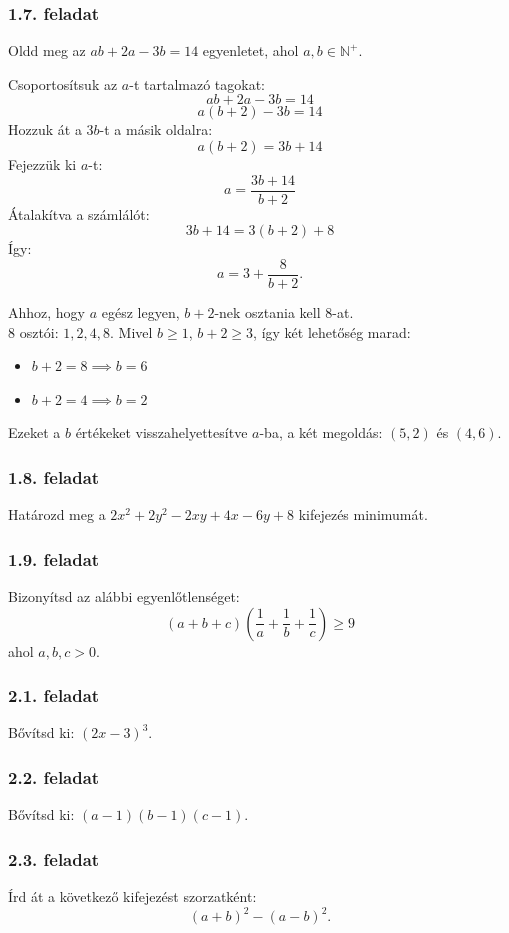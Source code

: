 \documentclass{article}
\begin{document}
\subsubsection{1.7. feladat}
Oldd meg az $ab + 2a - 3b = 14$ egyenletet, ahol $a, b \in \mathbb{N^+}$.

Csoportosítsuk az $a$-t tartalmazó tagokat:
\[
    ab + 2a - 3b = 14
\]
\[
    a(b+2) - 3b = 14
\]
Hozzuk át a $3b$-t a másik oldalra:
\[
    a(b+2) = 3b + 14
\]
Fejezzük ki $a$-t:
\[
    a = \frac{3b+14}{b+2} 
\]
Átalakítva a számlálót:
\[
    3b+14 = 3(b+2) + 8
\]
Így:
\[
    a = 3 + \frac{8}{b+2}.
\]

Ahhoz, hogy $a$ egész legyen, $b+2$-nek osztania kell 8-at.\\
8 osztói: $1, 2, 4, 8$. Mivel $b \ge 1$, $b+2 \ge 3$, így két lehetőség marad:
\begin{itemize}
    \item $b + 2 = 8 \implies b = 6$
    \item $b + 2 = 4 \implies b = 2$
\end{itemize}

Ezeket a $b$ értékeket visszahelyettesítve $a$-ba, a két megoldás: $(5,2)$ és $(4,6)$.

\subsubsection{1.8. feladat}
Határozd meg a $2x^2 + 2y^2 - 2xy + 4x -6y + 8$ kifejezés minimumát.

\subsubsection{1.9. feladat}
Bizonyítsd az alábbi egyenlőtlenséget:
\[
(a+b+c)\left(\frac{1}{a} + \frac{1}{b} + \frac{1}{c}\right) \ge 9
\]
ahol $a, b, c > 0$.

\subsubsection{2.1. feladat}
Bővítsd ki: $(2x-3)^3$.

\subsubsection{2.2. feladat}
Bővítsd ki: $(a-1)(b-1)(c-1)$.

\subsubsection{2.3. feladat}
Írd át a következő kifejezést szorzatként:
\begin{equation}
    (a+b)^2 - (a-b)^2.
\end{equation}
\end{document}
